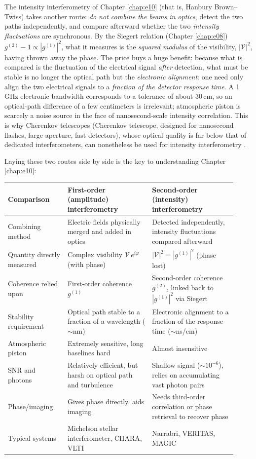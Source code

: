 The intensity interferometry of Chapter \ref{chap:e10} (that is, Hanbury Brown--Twiss) takes another route: \emph{do not combine the beams in optics}, detect the two paths independently, and compare afterward whether the two \emph{intensity fluctuations} are synchronous. By the Siegert relation (Chapter \ref{chap:e08}) \(g^{(2)}-1\propto|g^{(1)}|^2\), what it measures is the \emph{squared modulus} of the visibility, \(|\mathcal V|^2\), having thrown away the phase. The price buys a huge benefit: because what is compared is the fluctuation of the electrical signal \emph{after} detection, what must be stable is no longer the optical path but the \emph{electronic alignment}: one need only align the two electrical signals to a \emph{fraction of the detector response time}. A 1\,GHz electronic bandwidth corresponds to a tolerance of about 30\,cm, so an optical-path difference of a few centimeters is irrelevant; atmospheric piston is scarcely a noise source in the face of nanosecond-scale intensity correlation. This is why Cherenkov telescopes (Cherenkov telescope, designed for nanosecond flashes, large aperture, fast detectors), whose optical quality is far below that of dedicated interferometers, can nonetheless be used for intensity interferometry \citep{2020NatAs...4.1164A}.

Laying these two routes side by side is the key to understanding Chapter \ref{chap:e10}:

\begin{longtable}{p{0.24\linewidth}p{0.34\linewidth}p{0.34\linewidth}}
\toprule
Comparison & First-order (amplitude) interferometry & Second-order (intensity) interferometry \\
\midrule
Combining method & Electric fields physically merged and added in optics & Detected independently, intensity fluctuations compared afterward \\
Quantity directly measured & Complex visibility \(\mathcal V\,e^{i\varphi}\) (with phase) & \(|\mathcal V|^2=|g^{(1)}|^2\) (phase lost) \\
Coherence relied upon & First-order coherence \(g^{(1)}\) & Second-order coherence \(g^{(2)}\), linked back to \(|g^{(1)}|^2\) via Siegert \\
Stability requirement & Optical path stable to a fraction of a wavelength (\(\sim\)nm) & Electronic alignment to a fraction of the response time (\(\sim\)ns/cm) \\
Atmospheric piston & Extremely sensitive, long baselines hard & Almost insensitive \\
SNR and photons & Relatively efficient, but harsh on optical path and turbulence & Shallow signal (\(\sim10^{-6}\)), relies on accumulating vast photon pairs \\
Phase/imaging & Gives phase directly, aids imaging & Needs third-order correlation or phase retrieval to recover phase \\
Typical systems & Michelson stellar interferometer, CHARA, VLTI & Narrabri, VERITAS, MAGIC \\
\bottomrule
\end{longtable}

